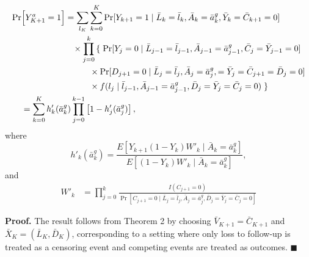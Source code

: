\begin{tcolorbox}[title=Corollary 5: Equivalence of g-formula and IPW representation for total effect]
\begin{align*}
\Pr& \Bigl[Y^{a}_{K+1}=1\Bigr] 
= \sum_{l_K} \sum_{k=0}^K \Pr[Y_{k+1} = 1 \mid \bar{L}_k = \bar{l}_k, \bar{A}_k = \bar{a}^g_k, \bar{Y}_k = \bar{C}_{k+1} = 0] \\
& \quad \quad \quad \quad\quad \quad \times \prod_{j=0}^{k} \left\{ \right.
\Pr[Y_j = 0 \mid \bar{L}_{j-1} = \bar{l}_{j-1}, \bar{A}_{j-1} = \bar{a}^g_{j-1}, \bar{C}_j = \bar{Y}_{j-1} = 0] \\
& \quad \quad\quad \quad\quad \quad\quad \quad \times \Pr[D_{j+1} = 0 \mid \bar{L}_j = \bar{l}_j, \bar{A}_j = \bar{a}^g_{j}, = \bar{Y}_j = \bar{C}_{j+1} = \bar{D}_j  = 0] \\
& \quad \quad\quad \quad\quad \quad\quad \quad \times f(l_j \mid \bar{l}_{j-1}, \bar{A}_{j-1} = \bar{a}^g_{j-1},  \bar{D}_j = \bar{Y}_j = \bar{C}_j = 0) 
\left. \right\} \\
& = \sum_{k=0}^K h'_k(\bar{a}^g_k) \prod_{j=0}^{k-1} \left[1 - h'_j(\bar{a}^g_j)\right],
\end{align*}
where
$$
h'_k(\bar{a}^g_k) = \frac{E[Y_{k+1}(1 - Y_k) W'_k \mid \bar{A}_k = \bar{a}^g_k]}{E[(1 - Y_k) W'_k \mid \bar{A}_k = \bar{a}^g_k]},
$$
and 
\begin{align*}
    W'_k &= \prod_{j=0}^k \frac{I(C_{j+1} = 0)}{\Pr[C_{j+1} = 0 \mid \bar{L}_j = \bar{l}_j, \bar{A}_j = \bar{a}^g_j, \bar{D}_j = \bar{Y}_j = \bar{C}_j = 0]}
\end{align*}
\end{tcolorbox}
\textbf{Proof.} The result follows from Theorem 2 by choosing \(\bar{V}_{K+1} = \bar{C}_{K+1}\) and \(\bar{X}_K = (\bar{L}_K, \bar{D}_K)\), corresponding to a setting where only loss to follow-up is treated as a censoring event and competing events are treated as outcomes. 
\(\blacksquare\)